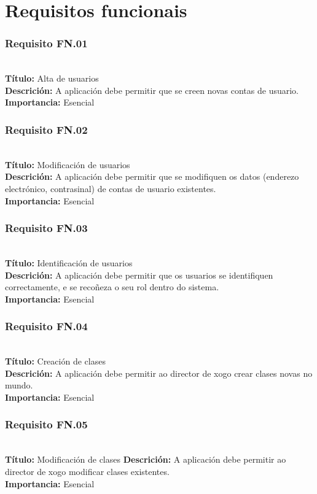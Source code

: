 \section{Requisitos funcionais}
\subsubsection{Requisito FN.01}~\\
{\bf Título:} Alta de usuarios\\
{\bf Descrición:} A aplicación debe permitir que se creen novas contas de usuario.\\
{\bf Importancia:} Esencial

\subsubsection{Requisito FN.02}~\\
{\bf Título:} Modificación de usuarios\\
{\bf Descrición:} A aplicación debe permitir que se modifiquen os datos
(enderezo electrónico, contrasinal) de contas de usuario existentes.\\
{\bf Importancia:} Esencial

\subsubsection{Requisito FN.03}~\\
{\bf Título:} Identificación de usuarios\\
{\bf Descrición:} A aplicación debe permitir que os usuarios se identifiquen
correctamente, e se recoñeza o seu rol dentro do sistema.\\
{\bf Importancia:} Esencial

\subsubsection{Requisito FN.04}~\\
{\bf Título:} Creación de clases\\
{\bf Descrición:} A aplicación debe permitir ao director de xogo crear clases
novas no mundo.\\
{\bf Importancia:} Esencial

\subsubsection{Requisito FN.05}~\\
{\bf Título:} Modificación de clases
{\bf Descrición:} A aplicación debe permitir ao director de xogo modificar
clases existentes.\\
{\bf Importancia:} Esencial

